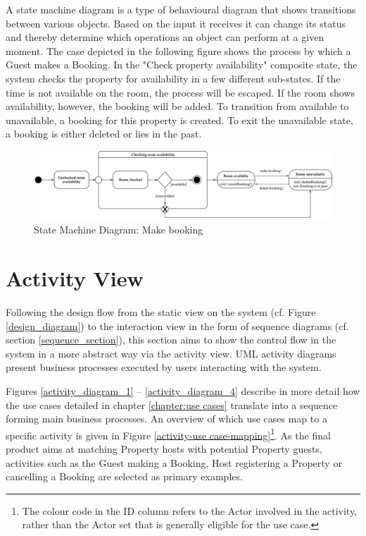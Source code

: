 A state machine diagram is a type of behavioural diagram that shows transitions between various objects. Based on the input it receives it can change its status and thereby determine which operations an object can perform at a given moment. The case depicted in the following figure shows the process by which a Guest makes a Booking. In the "Check property availability" composite state, the system checks the property for availability in a few different sub-states. If the time is not available on the room, the process will be escaped. If the room shows availability, however, the booking will be added. To transition from available to unavailable, a booking for this property is created. To exit the unavailable state, a booking is either deleted or lies in the past.

\begin{figure}[H]
    \centering
    \label{state_machine_diagram}
    \includegraphics[width=\textwidth]{img/state_machine_diagram.pdf}
    \caption{State Machine Diagram: Make booking}
\end{figure}


\section{Activity View}

Following the design flow from the static view on the system (cf. Figure \ref{design_diagram}) to the interaction view in the form of sequence diagrams (cf. section \ref{sequence_section}), this section aims to show the control flow in the system in a more abstract way via the activity view. UML activity diagrams present business processes executed by users interacting with the system.

Figures \ref{activity_diagram_1} -- \ref{activity_diagram_4} describe in more detail how the use cases detailed in chapter \ref{chapter:use cases} translate into a sequence forming main business processes. An overview of which use cases map to a specific activity is given in Figure \ref{activity-use case-mapping}\footnote{The colour code in the \textquotesingle ID \textquotesingle column refers to the Actor involved in the activity, rather than the Actor set that is generally eligible for the use case.}. As the final product aims at matching Property hosts with potential Property guests, activities such as the Guest making a Booking, Host registering a Property or cancelling a Booking are selected as primary examples.

